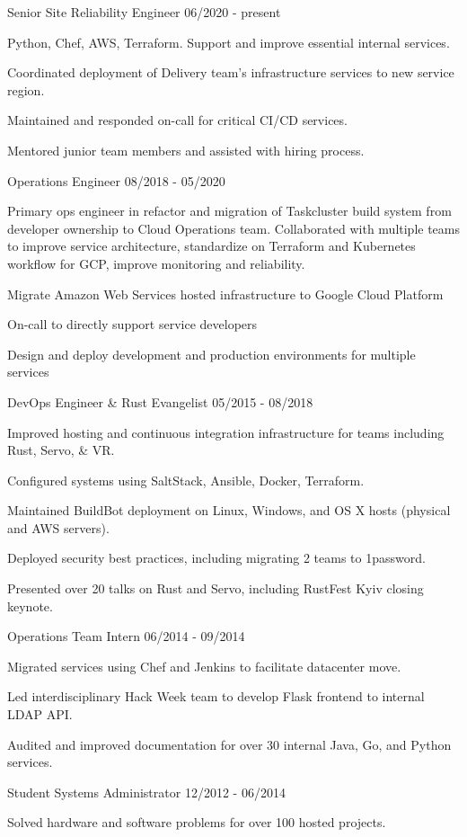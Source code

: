 \documentclass[11pt]{article} %
\begin{document}
\begin{description}
\squish
{}
           {Senior Site Reliability Engineer}
           {06/2020 - present}

Python, Chef, AWS, Terraform. Support and improve essential internal services. 

Coordinated deployment of Delivery team's infrastructure services to new service region.

Maintained and responded on-call for critical CI/CD services. 

Mentored junior team members and assisted with hiring process.

           {Operations Engineer}
           {08/2018 - 05/2020}

Primary ops engineer in refactor and migration of Taskcluster build system 
from developer ownership to Cloud Operations team. Collaborated with multiple
teams to improve service architecture, standardize on Terraform and 
Kubernetes workflow for GCP, improve monitoring and reliability. 

Migrate Amazon Web Services hosted infrastructure to Google Cloud Platform

On-call to directly support service developers

Design and deploy development and production environments for multiple services

           {DevOps Engineer \& Rust Evangelist}
           {05/2015 - 08/2018}

Improved hosting and continuous integration infrastructure for teams
including Rust, Servo, \& VR.

Configured systems using SaltStack, Ansible, Docker, Terraform.

Maintained BuildBot deployment on Linux, Windows, and OS X hosts (physical and
AWS servers).

Deployed security best practices, including migrating 2 teams to 1password.

Presented over 20 talks on Rust and Servo, including RustFest Kyiv closing keynote.

           {Operations Team Intern}
           {06/2014 - 09/2014}

Migrated services using Chef and Jenkins to facilitate datacenter move.

Led interdisciplinary Hack Week team to develop Flask frontend to internal
LDAP API.

Audited and improved documentation for over 30 internal Java, Go, and Python
services.

           {Student Systems Administrator}
           {12/2012 - 06/2014}

Solved hardware and software problems for over 100 hosted projects.

% 
% 

\end{description}
\end{document}
